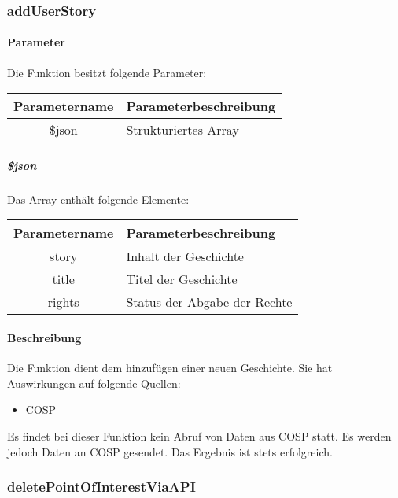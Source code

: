 \subsubsection{addUserStory}\label{api-functions:addUserStory}
\paragraph{Parameter} Die Funktion besitzt folgende Parameter:
\begin{table}[H]
	\begin{tabular}{|c|p{11cm}|}
		\hline
		\textbf{Parametername} & \textbf{Parameterbeschreibung} \\ \hline
		\$json & Strukturiertes Array \\ \hline
	\end{tabular}
\end{table}
\subparagraph{\$json}Das Array enthält folgende Elemente:
\begin{table}[H]
	\begin{tabular}{|c|p{11cm}|}
		\hline
		\textbf{Parametername} & \textbf{Parameterbeschreibung} \\ \hline
		story & Inhalt der Geschichte \\ \hline
		title & Titel der Geschichte \\ \hline
		rights & Status der Abgabe der Rechte \\ \hline
	\end{tabular}
\end{table}
\paragraph{Beschreibung} Die Funktion dient dem hinzufügen einer neuen Geschichte. Sie hat Auswirkungen auf folgende Quellen:
\begin{itemize}
	\item COSP
\end{itemize}
Es findet bei dieser Funktion kein Abruf von Daten aus {\glqq COSP\grqq} statt. Es werden jedoch Daten an {\glqq COSP\grqq} gesendet. Das Ergebnis ist stets erfolgreich.
\subsubsection{deletePointOfInterestViaAPI}
